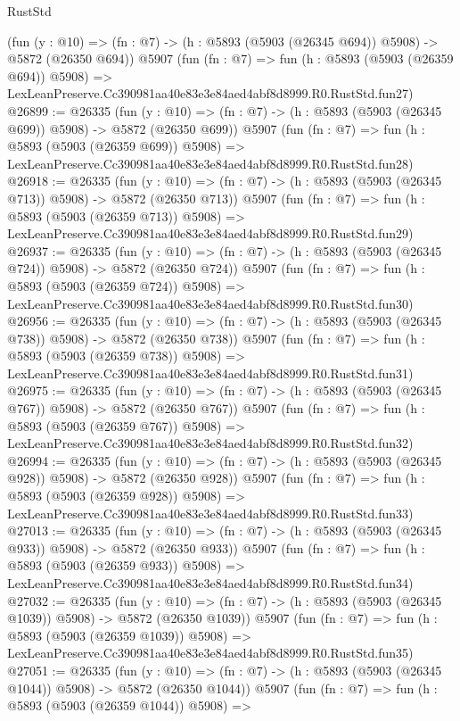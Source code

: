 \begin{lexlean}{RustStd}
\begin{coremodule}
    (fun (y : @10) => (fn : @7) -> (h : @5893 (@5903 (@26345 @694)) @5908) -> @5872 (@26350 @694))
    @5907
    (fun (fn : @7) =>
    fun (h : @5893 (@5903 (@26359 @694)) @5908) =>
    LexLeanPreserve.Cc390981aa40e83e3e84aed4abf8d8999.R0.RustStd.fun27)
@26899 := @26335
    (fun (y : @10) => (fn : @7) -> (h : @5893 (@5903 (@26345 @699)) @5908) -> @5872 (@26350 @699))
    @5907
    (fun (fn : @7) =>
    fun (h : @5893 (@5903 (@26359 @699)) @5908) =>
    LexLeanPreserve.Cc390981aa40e83e3e84aed4abf8d8999.R0.RustStd.fun28)
@26918 := @26335
    (fun (y : @10) => (fn : @7) -> (h : @5893 (@5903 (@26345 @713)) @5908) -> @5872 (@26350 @713))
    @5907
    (fun (fn : @7) =>
    fun (h : @5893 (@5903 (@26359 @713)) @5908) =>
    LexLeanPreserve.Cc390981aa40e83e3e84aed4abf8d8999.R0.RustStd.fun29)
@26937 := @26335
    (fun (y : @10) => (fn : @7) -> (h : @5893 (@5903 (@26345 @724)) @5908) -> @5872 (@26350 @724))
    @5907
    (fun (fn : @7) =>
    fun (h : @5893 (@5903 (@26359 @724)) @5908) =>
    LexLeanPreserve.Cc390981aa40e83e3e84aed4abf8d8999.R0.RustStd.fun30)
@26956 := @26335
    (fun (y : @10) => (fn : @7) -> (h : @5893 (@5903 (@26345 @738)) @5908) -> @5872 (@26350 @738))
    @5907
    (fun (fn : @7) =>
    fun (h : @5893 (@5903 (@26359 @738)) @5908) =>
    LexLeanPreserve.Cc390981aa40e83e3e84aed4abf8d8999.R0.RustStd.fun31)
@26975 := @26335
    (fun (y : @10) => (fn : @7) -> (h : @5893 (@5903 (@26345 @767)) @5908) -> @5872 (@26350 @767))
    @5907
    (fun (fn : @7) =>
    fun (h : @5893 (@5903 (@26359 @767)) @5908) =>
    LexLeanPreserve.Cc390981aa40e83e3e84aed4abf8d8999.R0.RustStd.fun32)
@26994 := @26335
    (fun (y : @10) => (fn : @7) -> (h : @5893 (@5903 (@26345 @928)) @5908) -> @5872 (@26350 @928))
    @5907
    (fun (fn : @7) =>
    fun (h : @5893 (@5903 (@26359 @928)) @5908) =>
    LexLeanPreserve.Cc390981aa40e83e3e84aed4abf8d8999.R0.RustStd.fun33)
@27013 := @26335
    (fun (y : @10) => (fn : @7) -> (h : @5893 (@5903 (@26345 @933)) @5908) -> @5872 (@26350 @933))
    @5907
    (fun (fn : @7) =>
    fun (h : @5893 (@5903 (@26359 @933)) @5908) =>
    LexLeanPreserve.Cc390981aa40e83e3e84aed4abf8d8999.R0.RustStd.fun34)
@27032 := @26335
    (fun (y : @10) => (fn : @7) -> (h : @5893 (@5903 (@26345 @1039)) @5908) -> @5872 (@26350 @1039))
    @5907
    (fun (fn : @7) =>
    fun (h : @5893 (@5903 (@26359 @1039)) @5908) =>
    LexLeanPreserve.Cc390981aa40e83e3e84aed4abf8d8999.R0.RustStd.fun35)
@27051 := @26335
    (fun (y : @10) => (fn : @7) -> (h : @5893 (@5903 (@26345 @1044)) @5908) -> @5872 (@26350 @1044))
    @5907
    (fun (fn : @7) =>
    fun (h : @5893 (@5903 (@26359 @1044)) @5908) =>

\end{coremodule}
\end{lexlean}
